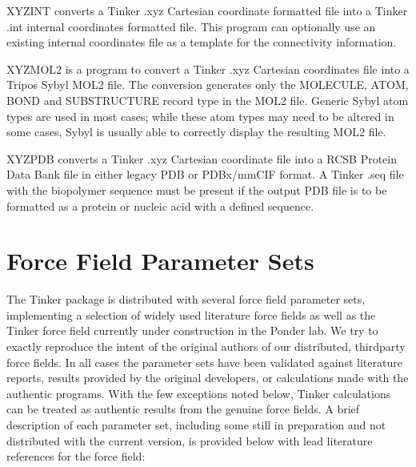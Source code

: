 \documentclass[letterpaper,11pt,english]{sphinxmanual}
\begin{document}
\sphinxAtStartPar
XYZINT converts a Tinker .xyz Cartesian coordinate formatted file into a Tinker .int internal coordinates formatted file. This program can optionally use an existing internal coordinates file as a template for the connectivity information.

\sphinxAtStartPar
{}

\sphinxAtStartPar
XYZMOL2 is a program to convert a Tinker .xyz Cartesian coordinates file into a Tripos Sybyl MOL2 file. The conversion generates only the MOLECULE, ATOM, BOND and SUBSTRUCTURE record type in the MOL2 file. Generic Sybyl atom types are used in most cases; while these atom types may need to be altered in some cases, Sybyl is usually able to correctly display the resulting MOL2 file.

\sphinxAtStartPar
{}

\sphinxAtStartPar
XYZPDB converts a Tinker .xyz Cartesian coordinate file into a RCSB Protein Data Bank file in either legacy PDB or PDBx/mmCIF format. A Tinker .seq file with the biopolymer sequence must be present if the output PDB file is to be formatted as a protein or nucleic acid with a defined sequence.

\sphinxstepscope


\chapter{Force Field Parameter Sets}
\label{\detokenize{text/parameters:force-field-parameter-sets}}\label{\detokenize{text/parameters::doc}}
\sphinxAtStartPar
The Tinker package is distributed with several force field parameter sets, implementing a selection of widely used literature force fields as well as the Tinker force field currently under construction in the Ponder lab. We try to exactly reproduce the intent of the original authors of our distributed, third\sphinxhyphen{}party force fields. In all cases the parameter sets have been validated against literature reports, results provided by the original developers, or calculations made with the authentic programs. With the few exceptions noted below, Tinker calculations can be treated as authentic results from the genuine force fields. A brief description of each parameter set, including some still in preparation and not distributed with the current version, is provided below with lead literature references for the force field:

\sphinxAtStartPar
{}
\end{document}
